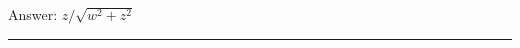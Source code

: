 \documentclass[11pt,paper=a4,answers]{exam}
\begin{document}
\begin{questions}
\begin{solution}
\vspace{15pt}
Answer: \colorbox{yellow!100}{$z/\sqrt{w^2+z^2}$}
\end{solution}









\end{questions}
\begin{center}
\rule{.5\textwidth}{1pt}
\end{center}
\end{document}
